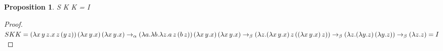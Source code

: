 \documentclass{article}
\newtheorem*{proposition}{Proposition}
\begin{document}
	\Large
	\begin{proposition}
		S K K = I
	\end{proposition}
	\begin{proof}
		$S K K = (\lambda x \, y \, z. x \, z \, (y \, z)) \, (\lambda x \, y. x) \, (\lambda x \, y. x) 
		\\* \to_\alpha (\lambda a. \lambda b. \lambda z. a \, z \, (b \, z)) \, (\lambda x \, y. x) \, (\lambda x \, y. x)
		\\* \to_\beta (\lambda z. (\lambda x \, y. x) \, z \, ((\lambda x \, y. x) \, z))
		\\* \to_\beta (\lambda z. (\lambda y. z) \, (\lambda y. z))
		\\* \to_\beta (\lambda z. z) = I$
	\end{proof}
\end{document}
